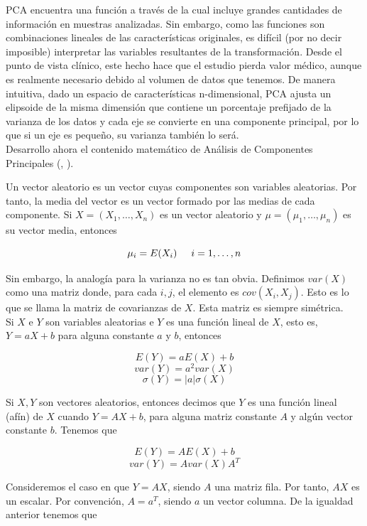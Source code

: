 PCA encuentra una función a través de la cual incluye grandes cantidades de información en muestras analizadas. Sin embargo, como las funciones son combinaciones lineales de las características originales, es difícil (por no decir imposible) interpretar las variables resultantes de la transformación. Desde el punto de vista clínico, este hecho hace que el estudio pierda valor médico, aunque es realmente necesario debido al volumen de datos que tenemos. De manera intuitiva, dado un espacio de características n-dimensional, PCA ajusta un elipsoide de la misma dimensión que contiene un porcentaje prefijado de la varianza de los datos y cada eje se convierte en una componente principal, por lo que si un eje es pequeño, su varianza también lo será. \\

Desarrollo ahora el contenido matemático de Análisis de Componentes Principales (\cite{amsa}, \cite{ms}).
\newpage
	
	Un vector aleatorio es un vector cuyas componentes son variables aleatorias. Por tanto, la media del vector es un vector formado por las medias de cada componente. Si $X = (X_1,\dots,X_n)$ es un vector aleatorio y $\mu = (\mu_1,\dots,\mu_n)$ es su vector media, entonces
	
	$$\mu_i = E(X_i) \hspace{0.5cm} i =1, \dots, n$$
	
	Sin embargo, la analogía para la varianza no es tan obvia. Definimos $var(X)$ como una matriz donde, para cada $i,j$, el elemento es $cov(X_i,X_j)$. Esto es lo que se llama la matriz de covarianzas de $X$. Esta matriz es siempre simétrica. \\
	
	Si $X$ e $Y$ son variables aleatorias e $Y$ es una función lineal de $X$, esto es, $Y = aX + b$ para alguna constante $a$ y $b$, entonces
	
	$$E(Y) = a E(X) + b$$
	$$var(Y) = a^2 var(X)$$
	$$\sigma(Y) =  |a| \sigma(X)$$
	
	Si $X,Y$ son vectores aleatorios, entonces decimos que $Y$ es una función lineal (afín) de $X$ cuando $Y = AX +b$, para alguna matriz constante $A$ y algún vector constante $b$. Tenemos que
	
	$$E(Y) = A E(X) + b $$
	$$var(Y) = A var(X) A^T$$
	
	
	Consideremos el caso en que $Y = AX$, siendo $A$ una matriz fila. Por tanto, $AX$ es un escalar. Por convención, $A = a^T$, siendo $a$ un vector columna. De la igualdad anterior tenemos que
	
